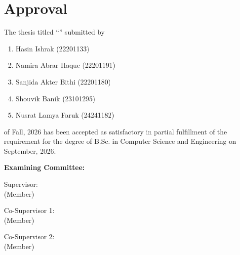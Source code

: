 \section*{Approval}

\vspace{-0.2cm}
The thesis titled ``\thesistitle'' submitted by 
\begin{enumerate}\setlength{\itemsep}{0pt}\setlength{\parskip}{0pt}\setlength{\parsep}{0pt}\setlength{\topsep}{0pt}
\item Hasin Ishrak (22201133)
\item Namira Abrar Haque (22201191)
\item Sanjida Akter Bithi (22201180) 
\item Shouvik Banik (23101295)
\item Nusrat Lamya Faruk (24241182)
\end{enumerate}

of Fall, 2026 has been accepted as satisfactory in partial fulfillment of the requirement for the degree of B.Sc. in Computer Science and Engineering on September, 2026. 

\vspace{0.2cm}
\textbf{Examining Committee:}

\vspace{0.3cm}

\noindent
Supervisor:\\
(Member)\\
\hspace*{7cm} 

\vspace{0.6cm}

\noindent
Co-Supervisor 1:\\
(Member)\\
\hspace*{7cm} 

\vspace{0.6cm}

\noindent
Co-Supervisor 2:\\
(Member)\\
\hspace*{7cm} 

